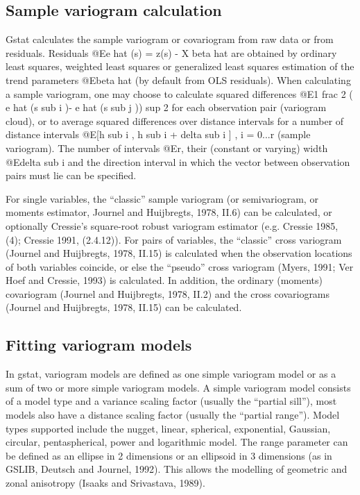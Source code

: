 \documentclass{article}
\begin{document}
\subsection{Sample variogram calculation}
Gstat calculates the sample variogram or covariogram from raw data or
from residuals. Residuals @E{e hat (s) = z(s) - X beta hat} are obtained
by ordinary least squares, weighted least squares or generalized least
squares estimation of the trend parameters @E{beta hat} (by default from
OLS residuals).  When calculating a sample variogram, one may choose to
calculate squared differences @E{1 frac 2 ( e hat (s sub i )- e hat (s
sub j )) sup 2} for each observation pair (variogram cloud), or to
average squared differences over distance intervals for a number of
distance intervals @E{[h sub i , h sub i + delta sub i ] , i = 0...r}
(sample variogram).  The number of intervals @E{r}, their (constant or
varying) width @E{delta sub i} and the direction interval in which the
vector between observation pairs must lie can be specified.

For single variables, the ``classic'' sample variogram (or
semivariogram, or moments estimator, Journel and Huijbregts, 1978, II.6)
can be calculated, or optionally Cressie's square-root robust variogram
estimator (e.g. Cressie 1985, (4); Cressie 1991, (2.4.12)). For pairs of
variables, the ``classic'' cross variogram (Journel and Huijbregts,
1978, II.15) is calculated when the observation locations of both
variables coincide, or else the ``pseudo'' cross variogram (Myers, 1991;
Ver Hoef and Cressie, 1993) is calculated. In addition, the ordinary
(moments) covariogram (Journel and Huijbregts, 1978, II.2) and the cross
covariograms (Journel and Huijbregts, 1978, II.15) can be calculated.

\subsection{Fitting variogram models}
In gstat, variogram models are defined as one simple variogram model or
as a sum of two or more simple variogram models. A simple variogram
model consists of a model type and a variance scaling factor (usually
the ``partial sill''), most models also have a distance scaling factor
(usually the ``partial range''). Model types supported include the nugget,
linear, spherical, exponential, Gaussian, circular, pentaspherical,
power and logarithmic model. The range parameter can be defined as an
ellipse in 2 dimensions or an ellipsoid in 3 dimensions (as in GSLIB,
Deutsch and Journel, 1992). This allows the modelling of geometric and
zonal anisotropy (Isaaks and Srivastava, 1989).
\end{document}
